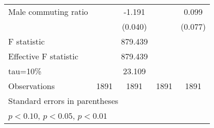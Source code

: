 \begin{tabular}{l*{4}{c}}
\addlinespace
Male commuting ratio&                     &      -1.191\sym{***}&                     &       0.099         \\
                    &                     &     (0.040)         &                     &     (0.077)         \\
\midrule
F statistic         &                     &     879.439         &                     &                     \\
Effective F statistic&                     &     879.439         &                     &                     \\
tau=10\%            &                     &      23.109         &                     &                     \\
Observations        &        1891         &        1891         &        1891         &        1891         \\
\bottomrule \multicolumn{5}{l}{\footnotesize Standard errors in parentheses}\\ \multicolumn{5}{l}{\footnotesize \sym{*} \(p<0.10\), \sym{**} \(p<0.05\), \sym{***} \(p<0.01\)} \end{tabular}
